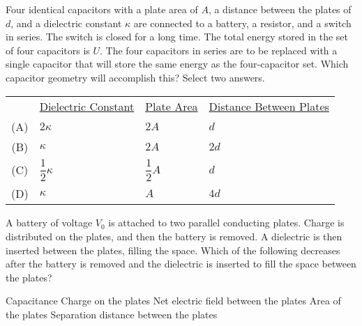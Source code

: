 \documentclass{../../oss-apphys-exam}
\begin{document}
\begin{questions}
  \question Four identical capacitors with a plate area of $A$, a distance
  between the plates of $d$, and a dielectric constant $\kappa$ are connected
  to a battery, a resistor, and a switch in series. The switch is closed for a
  long time. The total energy stored in the set of four capacitors is $U$. The
  four capacitors in series are to be replaced with a single capacitor that will
  store the same energy as the four-capacitor set. Which capacitor
  geometry will accomplish this? Select two answers.

  \begin{tabular}{clll}
    & \underline{Dielectric Constant} & \underline{Plate Area}
    & \underline{Distance Between Plates} \\
    (A) & $2\kappa$        & $2A$        & $d$ \\
    (B) & $\kappa$         & $2A$        & $2d$ \\
    (C) & $\dfrac12\kappa$ & $\dfrac12A$ & $d$ \\
    (D) & $\kappa$         & $A$         & $4d$ \\
  \end{tabular}
  \newpage
  
  \question A battery of voltage $V_0$ is attached to two parallel conducting
  plates. Charge is distributed on the plates, and then the battery is
  removed. A dielectric is then inserted between the plates, filling the
  space. Which of the following decreases after the battery is removed and the
  dielectric is inserted to fill the space between the plates?
  \begin{choices}
    \choice Capacitance
    \choice Charge on the plates
    \choice Net electric field between the plates
    \choice Area of the plates
    \choice Separation distance between the plates
  \end{choices}
  

\end{questions}
\end{document}
